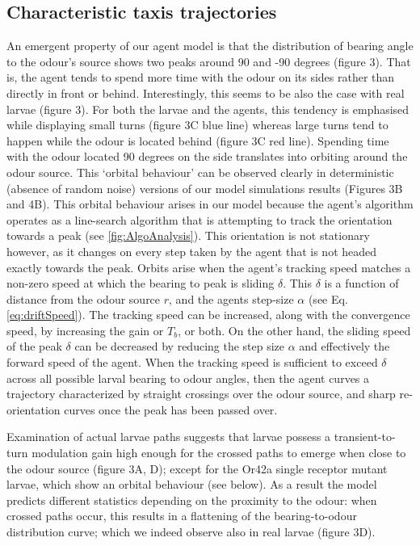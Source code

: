 \documentclass[10pt,a4paper]{article}
\begin{document}
\subsection{Characteristic taxis trajectories}
An emergent property of our agent model is that the distribution of bearing angle to the odour's source shows two peaks around 90 and -90 degrees (figure 3). That is, the agent tends to spend more time with the odour on its sides rather than directly in front or behind. Interestingly, this seems to be also the case with real larvae (figure 3). For both the larvae and the agents, this tendency is emphasised while displaying small turns (figure 3C blue line) whereas large turns tend to happen while the odour is located behind (figure 3C red line). Spending time with the odour located 90 degrees on the side translates into orbiting around the odour source. This ‘orbital behaviour’ can be observed clearly in deterministic (absence of random noise) versions of our model simulations results (Figures 3B and 4B).
 This orbital behaviour arises in our model because the agent's algorithm operates as a line-search algorithm that is attempting to track the orientation towards a peak (see \ref{fig:AlgoAnalysis}). This orientation is not stationary however, as it changes on every step taken by the agent that is not headed exactly towards the peak. Orbits arise when the agent's tracking speed matches a non-zero speed at which the bearing  to peak is sliding $\delta$. This $\delta$ is a function of distance from the odour source $r$, and the agents step-size $\alpha$ (see Eq. \eqref{eq:driftSpeed}). The tracking speed can be increased, along with the convergence speed, by increasing the gain or $T_b$, or both. On the other hand, the sliding speed of the peak $\delta$ can be decreased by reducing the step size $\alpha$ and effectively the forward speed of the agent. When the tracking speed is sufficient to exceed $\delta$ across all possible larval bearing to odour angles, then the agent curves a trajectory characterized by straight crossings over the odour source, and sharp re-orientation curves once the peak has been passed over. 

 Examination of actual larvae paths suggests that larvae possess a transient-to-turn modulation gain high enough for the crossed paths to emerge when close to the odour source (figure 3A, D); except for the Or42a single receptor mutant larvae, which show an orbital behaviour (see below). As a result the model predicts different statistics depending on the proximity to the odour: when crossed paths occur, this results in a flattening of the bearing-to-odour distribution curve; which we indeed observe also in real larvae (figure 3D). 
\end{document}

